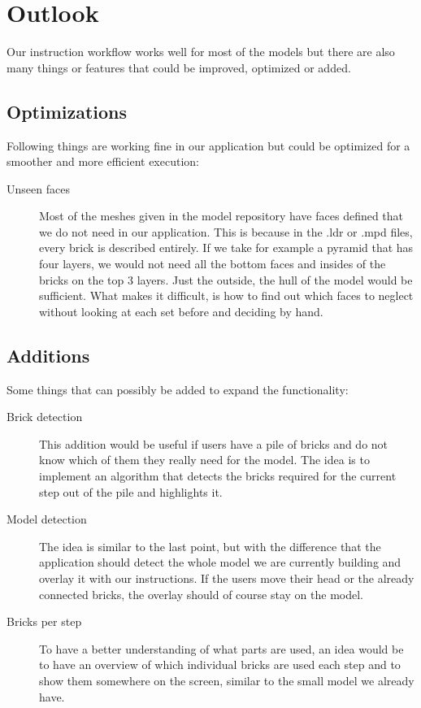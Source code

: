 \chapter{Outlook}
\label{cha:outlook}

Our instruction workflow works well for most of the models but there are also many things or features that could be improved, optimized or added. 

\section{Optimizations}

Following things are working fine in our application but could be optimized for a smoother and more efficient execution: 

\begin{description}
\item[Unseen faces]
Most of the meshes given in the model repository have faces defined that we do not need in our application. This is because in the .ldr or .mpd files, every brick is described entirely. If we take for example a pyramid that has four layers, we would not need all the bottom faces and insides of the bricks on the top 3 layers. Just the outside, the hull of the model would be sufficient. What makes it difficult, is how to find out which faces to neglect without looking at each set before and deciding by hand.

\end{description}

\section{Additions}
Some things that can possibly be added to expand the functionality:

\begin{description}
\item[Brick detection]
This addition would be useful if users have a pile of bricks and do not know which of them they really need for the model. The idea is to implement an algorithm that detects the bricks required for the current step out of the pile and highlights it. 

\item[Model detection]
The idea is similar to the last point, but with the difference that the application should detect the whole model we are currently building and overlay it with our instructions. If the users move their head or the already connected bricks, the overlay should of course stay on the model.

\item[Bricks per step] 
To have a better understanding of what parts are used, an idea would be to have an overview of which individual bricks are used each step and to show them somewhere on the screen, similar to the small model we already have.
\end{description}

